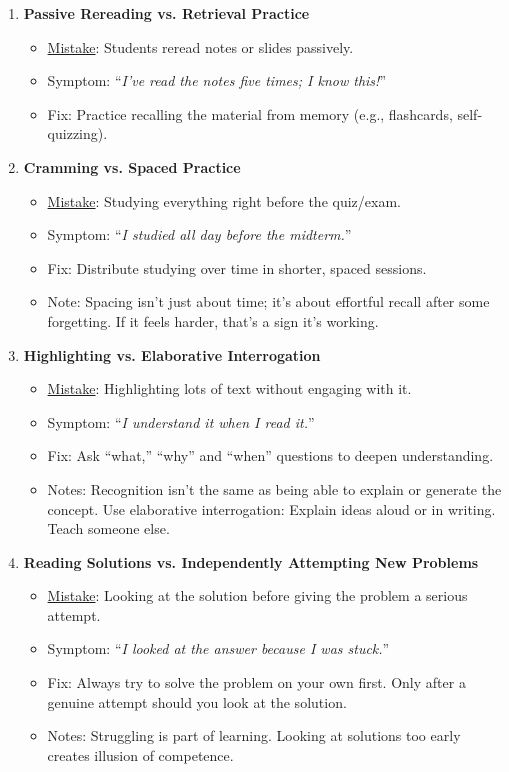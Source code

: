 \documentclass[12pt]{article}
\begin{document}
\begin{enumerate}
\item \textbf{Passive Rereading vs. Retrieval Practice}
\begin{itemize}
    \item \underline{Mistake}: Students reread notes or slides passively.
    \item Symptom: ``\emph{I’ve read the notes five times; I know this!}''
    \item Fix: Practice recalling the material from memory (e.g., flashcards, self-quizzing).
\end{itemize}

\item \textbf{Cramming vs. Spaced Practice}
\begin{itemize}
    \item \underline{Mistake}: Studying everything right before the quiz/exam.
    \item Symptom: ``\emph{I studied all day before the midterm.}''
    \item Fix: Distribute studying over time in shorter, spaced sessions.
    \item Note: Spacing isn’t just about time; it’s about effortful recall after some forgetting. If it feels harder, that’s a sign it’s working.
\end{itemize}

\item \textbf{Highlighting vs. Elaborative Interrogation}
\begin{itemize}
    \item \underline{Mistake}: Highlighting lots of text without engaging with it.
    \item Symptom: ``\emph{I understand it when I read it.}''
    \item Fix: Ask ``what,'' ``why'' and ``when'' questions to deepen understanding.
    \item Notes: Recognition isn’t the same as being able to explain or generate the concept. Use elaborative interrogation: Explain ideas aloud or in writing. Teach someone else.
\end{itemize}

\item \textbf{Reading Solutions vs. Independently Attempting New Problems}
\begin{itemize}
    \item \underline{Mistake}: Looking at the solution before giving the problem a serious attempt.
    \item Symptom: ``\emph{I looked at the answer because I was stuck.}''
    \item Fix: Always try to solve the problem on your own first. Only after a genuine attempt should you look at the solution.
    \item Notes: Struggling is part of learning. Looking at solutions too early creates illusion of competence.
\end{itemize}


\end{enumerate}
\end{document}
